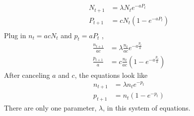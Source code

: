 \begin{homeworkProblem}[7][(a)]

\begin{align*}
    N_{t+1} &= \lambda N_{t} e^{-aP_t}\\
    P_{t+1} &= c N_{t} (1 - e^{-aP_t})\\
\end{align*}
    Plug in $ n_t = acN_t $ and $ p_t = aP_t $ , \\
    \begin{align*}
        \frac{n_{t+1}}{ac} &= \lambda \frac{n_t}{ac} e^{-a\frac{p_t}{a}}\\
        \frac{p_{t+1}}{a} &= c\frac{n_t}{ac} (1 - e^{-a\frac{p_t}{a}}) 
    \end{align*}
    After canceling $a$ and $c$, the equations look like \begin{align*}
        n_{t+1} &= \lambda n_t e^{-p_t} \\
        p_{t+1} &= n_t (1 - e^{-p_t})
    \end{align*}
    There are only one parameter, $\lambda$, in this system of equations.
\end{homeworkProblem}
